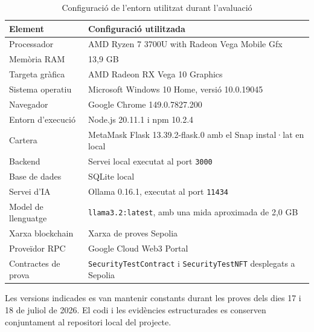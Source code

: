 \begin{table}[htbp]
\centering
\small
\renewcommand{\arraystretch}{1.2}
\begin{tabularx}{\textwidth}{p{} X}
\hline
\textbf{Element} & \textbf{Configuració utilitzada} \\
\hline

Processador &
AMD Ryzen 7 3700U with Radeon Vega Mobile Gfx \\

Memòria RAM &
13,9 GB \\

Targeta gràfica &
AMD Radeon RX Vega 10 Graphics \\

Sistema operatiu &
Microsoft Windows 10 Home, versió 10.0.19045 \\

Navegador &
Google Chrome 149.0.7827.200 \\

Entorn d'execució &
Node.js 20.11.1 i npm 10.2.4 \\

Cartera &
MetaMask Flask 13.39.2-flask.0 amb el Snap instal·lat en local \\

Backend &
Servei local executat al port \texttt{3000} \\

Base de dades &
SQLite local \\

Servei d'IA &
Ollama 0.16.1, executat al port \texttt{11434} \\

Model de llenguatge &
\texttt{llama3.2:latest}, amb una mida aproximada de 2,0 GB \\

Xarxa blockchain &
Xarxa de proves Sepolia \\

Proveïdor RPC &
Google Cloud Web3 Portal \\

Contractes de prova &
\texttt{SecurityTestContract} i \texttt{SecurityTestNFT} desplegats a Sepolia \\
\hline
\end{tabularx}
\caption{Configuració de l'entorn utilitzat durant l'avaluació}
\label{tab:configuracio_avaluacio}
\end{table}

Les versions indicades es van mantenir constants durant les proves dels dies 17 i 18 de juliol de 2026. El codi i les evidències estructurades es conserven conjuntament al repositori local del projecte.

